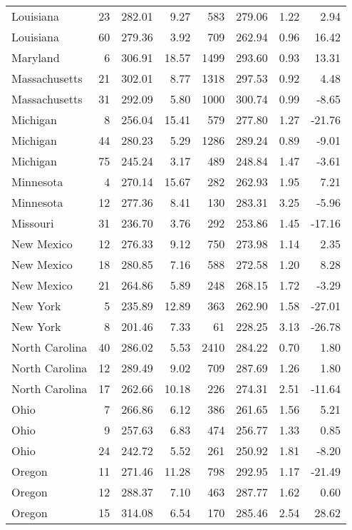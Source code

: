 \begin{longtable}{lrrr@{\extracolsep{10pt}}rrrr}
  Louisiana &  23 & 282.01 & 9.27 & 583 & 279.06 & 1.22 & 2.94 \\ 
  Louisiana &  60 & 279.36 & 3.92 & 709 & 262.94 & 0.96 & 16.42 \\ 
  Maryland &   6 & 306.91 & 18.57 & 1499 & 293.60 & 0.93 & 13.31 \\ 
  Massachusetts &  21 & 302.01 & 8.77 & 1318 & 297.53 & 0.92 & 4.48 \\ 
  Massachusetts &  31 & 292.09 & 5.80 & 1000 & 300.74 & 0.99 & -8.65 \\ 
  Michigan &   8 & 256.04 & 15.41 & 579 & 277.80 & 1.27 & -21.76 \\ 
  Michigan &  44 & 280.23 & 5.29 & 1286 & 289.24 & 0.89 & -9.01 \\ 
  Michigan &  75 & 245.24 & 3.17 & 489 & 248.84 & 1.47 & -3.61 \\ 
  Minnesota &   4 & 270.14 & 15.67 & 282 & 262.93 & 1.95 & 7.21 \\ 
  Minnesota &  12 & 277.36 & 8.41 & 130 & 283.31 & 3.25 & -5.96 \\ 
  Missouri &  31 & 236.70 & 3.76 & 292 & 253.86 & 1.45 & -17.16 \\ 
  New Mexico &  12 & 276.33 & 9.12 & 750 & 273.98 & 1.14 & 2.35 \\ 
  New Mexico &  18 & 280.85 & 7.16 & 588 & 272.58 & 1.20 & 8.28 \\ 
  New Mexico &  21 & 264.86 & 5.89 & 248 & 268.15 & 1.72 & -3.29 \\ 
  New York &   5 & 235.89 & 12.89 & 363 & 262.90 & 1.58 & -27.01 \\ 
  New York &   8 & 201.46 & 7.33 &  61 & 228.25 & 3.13 & -26.78 \\ 
  North Carolina &  40 & 286.02 & 5.53 & 2410 & 284.22 & 0.70 & 1.80 \\ 
  North Carolina &  12 & 289.49 & 9.02 & 709 & 287.69 & 1.26 & 1.80 \\ 
  North Carolina &  17 & 262.66 & 10.18 & 226 & 274.31 & 2.51 & -11.64 \\ 
  Ohio &   7 & 266.86 & 6.12 & 386 & 261.65 & 1.56 & 5.21 \\ 
  Ohio &   9 & 257.63 & 6.83 & 474 & 256.77 & 1.33 & 0.85 \\ 
  Ohio &  24 & 242.72 & 5.52 & 261 & 250.92 & 1.81 & -8.20 \\ 
  Oregon &  11 & 271.46 & 11.28 & 798 & 292.95 & 1.17 & -21.49 \\ 
  Oregon &  12 & 288.37 & 7.10 & 463 & 287.77 & 1.62 & 0.60 \\ 
  Oregon &  15 & 314.08 & 6.54 & 170 & 285.46 & 2.54 & 28.62 \\ 

\end{longtable}
